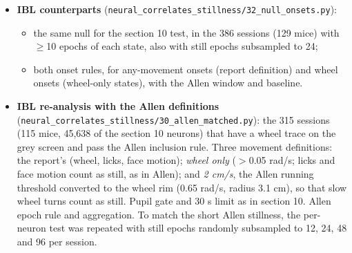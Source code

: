 \documentclass[10pt,a4paper]{article}
\begin{document}
\begin{itemize}
\begin{itemize}
\item the pre-movement rise for onsets preceded by $\geq$3 s against $\geq$1 s of awake stillness, in sessions with $\geq$3 such onsets.
\end{itemize}
 Its OpenScope coupling analysis is described in section 14.
\item \textbf{IBL counterparts} (\texttt{neural\_\allowbreak{}correlates\_\allowbreak{}stillness/\allowbreak{}32\_\allowbreak{}null\_\allowbreak{}onsets.py}): 
\begin{itemize}
\item the same null for the section 10 test, in the 386 sessions (129 mice) with $\geq$10 epochs of each state, also with still epochs subsampled to 24;
\item both onset rules, for any-movement onsets (report definition) and wheel onsets (wheel-only states), with the Allen window and baseline.
\end{itemize}
\item \textbf{IBL re-analysis with the Allen definitions} (\texttt{neural\_\allowbreak{}correlates\_\allowbreak{}stillness/\allowbreak{}30\_\allowbreak{}allen\_\allowbreak{}matched.py}): the 315 sessions (115 mice, 45,638 of the section 10 neurons) that have a wheel trace on the grey screen and pass the Allen inclusion rule. Three movement definitions: the report's (wheel, licks, face motion); \emph{wheel only} ($>$0.05 rad/s; licks and face motion count as still, as in Allen); and \emph{2 cm/s}, the Allen running threshold converted to the wheel rim (0.65 rad/s, radius 3.1 cm), so that slow wheel turns count as still. Pupil gate and 30 s limit as in section 10. Allen epoch rule and aggregation. To match the short Allen stillness, the per-neuron test was repeated with still epochs randomly subsampled to 12, 24, 48 and 96 per session.
\end{itemize}
\end{document}
